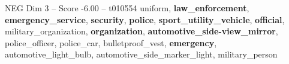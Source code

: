 \begin{textsample}{NEG Dim 3 – Score -6.00 – t010554}  \label{ex:f3_neg_021}
uniform, \textbf{law\_enforcement}, \textbf{emergency\_service}, \textbf{security}, \textbf{police}, \textbf{sport\_utility\_vehicle}, \textbf{official}, military\_organization, \textbf{organization}, \textbf{automotive\_side-view\_mirror}, police\_officer, police\_car, bulletproof\_vest, \textbf{emergency}, automotive\_light\_bulb, automotive\_side\_marker\_light, military\_person

\end{textsample}

